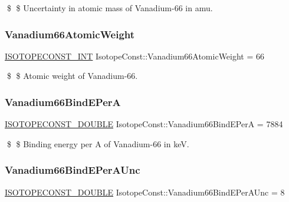 \$ \$ Uncertainty in atomic mass of Vanadium-\/66 in amu. \mbox{\label{group___isotope_const-_vanadium-_v66_ga159e5003c881723cec389aa0dbca0256}} 
\subsubsection{\texorpdfstring{Vanadium66\+Atomic\+Weight}{Vanadium66AtomicWeight}}
{\footnotesize\ttfamily \mbox{\hyperlink{group___isotope_const-_macros_ga5f18360b3e99483a35c32d789e62621c}{I\+S\+O\+T\+O\+P\+E\+C\+O\+N\+S\+T\+\_\+\+I\+NT}} Isotope\+Const\+::\+Vanadium66\+Atomic\+Weight = 66}

\$ \$ Atomic weight of Vanadium-\/66. \mbox{\label{group___isotope_const-_vanadium-_v66_gae288e9b0a815e5306c11dcb1ae05aaf0}} 
\subsubsection{\texorpdfstring{Vanadium66\+Bind\+E\+PerA}{Vanadium66BindEPerA}}
{\footnotesize\ttfamily \mbox{\hyperlink{group___isotope_const-_macros_ga8f45a7272ce02c0b4c65c44636ed719a}{I\+S\+O\+T\+O\+P\+E\+C\+O\+N\+S\+T\+\_\+\+D\+O\+U\+B\+LE}} Isotope\+Const\+::\+Vanadium66\+Bind\+E\+PerA = 7884}

\$ \$ Binding energy per A of Vanadium-\/66 in keV. \mbox{\label{group___isotope_const-_vanadium-_v66_gace5ad70d49eb0e9b8c016fc0d0663d6e}} 
\subsubsection{\texorpdfstring{Vanadium66\+Bind\+E\+Per\+A\+Unc}{Vanadium66BindEPerAUnc}}
{\footnotesize\ttfamily \mbox{\hyperlink{group___isotope_const-_macros_ga8f45a7272ce02c0b4c65c44636ed719a}{I\+S\+O\+T\+O\+P\+E\+C\+O\+N\+S\+T\+\_\+\+D\+O\+U\+B\+LE}} Isotope\+Const\+::\+Vanadium66\+Bind\+E\+Per\+A\+Unc = 8}

